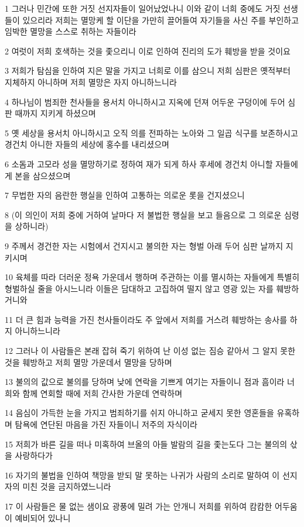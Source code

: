 \par 1 그러나 민간에 또한 거짓 선지자들이 일어났었나니 이와 같이 너희 중에도 거짓 선생들이 있으리라 저희는 멸망케 할 이단을 가만히 끌어들여 자기들을 사신 주를 부인하고 임박한 멸망을 스스로 취하는 자들이라
\par 2 여럿이 저희 호색하는 것을 좇으리니 이로 인하여 진리의 도가 훼방을 받을 것이요
\par 3 저희가 탐심을 인하여 지은 말을 가지고 너희로 이를 삼으니 저희 심판은 옛적부터 지체하지 아니하며 저희 멸망은 자지 아니하느니라
\par 4 하나님이 범죄한 천사들을 용서치 아니하시고 지옥에 던져 어두운 구덩이에 두어 심판 때까지 지키게 하셨으며
\par 5 옛 세상을 용서치 아니하시고 오직 의를 전파하는 노아와 그 일곱 식구를 보존하시고 경건치 아니한 자들의 세상에 홍수를 내리셨으며
\par 6 소돔과 고모라 성을 멸망하기로 정하여 재가 되게 하사 후세에 경건치 아니할 자들에게 본을 삼으셨으며
\par 7 무법한 자의 음란한 행실을 인하여 고통하는 의로운 롯을 건지셨으니
\par 8 (이 의인이 저희 중에 거하여 날마다 저 불법한 행실을 보고 들음으로 그 의로운 심령을 상하니라)
\par 9 주께서 경건한 자는 시험에서 건지시고 불의한 자는 형벌 아래 두어 심판 날까지 지키시며
\par 10 육체를 따라 더러운 정욕 가운데서 행하며 주관하는 이를 멸시하는 자들에게 특별히 형벌하실 줄을 아시느니라 이들은 담대하고 고집하여 떨지 않고 영광 있는 자를 훼방하거니와
\par 11 더 큰 힘과 능력을 가진 천사들이라도 주 앞에서 저희를 거스려 훼방하는 송사를 하지 아니하느니라
\par 12 그러나 이 사람들은 본래 잡혀 죽기 위하여 난 이성 없는 짐승 같아서 그 알지 못한 것을 훼방하고 저희 멸망 가운데서 멸망을 당하며
\par 13 불의의 값으로 불의를 당하며 낮에 연락을 기쁘게 여기는 자들이니 점과 흠이라 너희와 함께 연회할 때에 저희 간사한 가운데 연락하며
\par 14 음심이 가득한 눈을 가지고 범죄하기를 쉬지 아니하고 굳세지 못한 영혼들을 유혹하며 탐욕에 연단된 마음을 가진 자들이니 저주의 자식이라
\par 15 저희가 바른 길을 떠나 미혹하여 브올의 아들 발람의 길을 좇는도다 그는 불의의 삯을 사랑하다가
\par 16 자기의 불법을 인하여 책망을 받되 말 못하는 나귀가 사람의 소리로 말하여 이 선지자의 미친 것을 금지하였느니라
\par 17 이 사람들은 물 없는 샘이요 광풍에 밀려 가는 안개니 저희를 위하여 캄캄한 어두움이 예비되어 있나니
